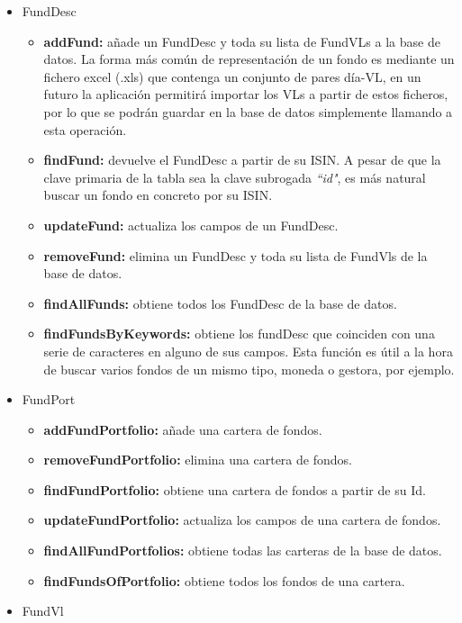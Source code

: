 \documentclass[12pt, a4paper]{book}
\begin{document}
\begin{itemize}
	\item FundDesc
						 \begin{itemize}
							\item \textbf{addFund:} añade un FundDesc y toda su lista de FundVLs a la base de datos. La forma más común de representación de un fondo es mediante un fichero excel (.xls) que contenga un conjunto de pares día-\gls{VL}, en un futuro la aplicación permitirá importar los \gls{VL}s a partir de estos ficheros, por lo que se podrán guardar en la base de datos simplemente llamando a esta operación.
							\item \textbf{findFund:} devuelve el FundDesc a partir de su \gls{ISIN}. A pesar de que la clave primaria de la tabla sea la clave subrogada \textit{``id"}, es más natural buscar un fondo en concreto por su \gls{ISIN}.
							\item \textbf{updateFund:} actualiza los campos de un FundDesc.
							\item \textbf{removeFund:} elimina un FundDesc y toda su lista de FundVls de la base de datos.
							\item \textbf{findAllFunds:} obtiene todos los FundDesc de la base de datos.
							\item \textbf{findFundsByKeywords:} obtiene los fundDesc que coinciden con una serie de caracteres en alguno de sus campos. Esta función es útil a la hora de buscar varios fondos de un mismo tipo, moneda o gestora, por ejemplo.
				 		 \end{itemize}
	\item FundPort
						\begin{itemize}
							\item \textbf{addFundPortfolio:} añade una cartera de fondos.
							\item \textbf{removeFundPortfolio:} elimina una cartera de fondos.
							\item \textbf{findFundPortfolio:} obtiene una cartera de fondos a partir de su Id.
							\item \textbf{updateFundPortfolio:} actualiza los campos de una cartera de fondos.
							\item \textbf{findAllFundPortfolios:} obtiene todas las carteras de la base de datos.
							\item \textbf{findFundsOfPortfolio:} obtiene todos los fondos de una cartera.
						\end{itemize}
					\newpage
	\item FundVl
						\begin{itemize}

\end{itemize}
\end{itemize}
\end{document}
